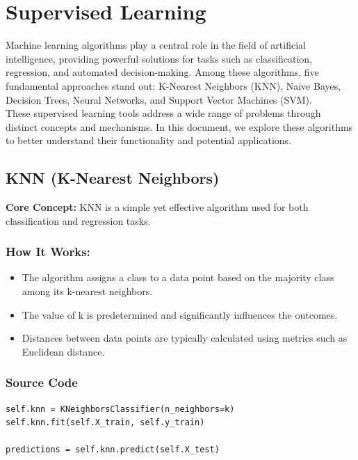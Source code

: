 \documentclass[a4paper,12pt]{article}
\begin{document}
\section{Supervised Learning}
Machine learning algorithms play a central role in the field of artificial intelligence, providing powerful solutions for tasks such as classification, regression, and automated decision-making. Among these algorithms, five fundamental approaches stand out: K-Nearest Neighbors (KNN), Naive Bayes, Decision Trees, Neural Networks, and Support Vector Machines (SVM).\\

These supervised learning tools address a wide range of problems through distinct concepts and mechanisms. In this document, we explore these algorithms to better understand their functionality and potential applications.

\subsection{KNN (K-Nearest Neighbors)}
\textbf{Core Concept:} KNN is a simple yet effective algorithm used for both classification and regression tasks.
\subsubsection*{How It Works:}
\begin{itemize}
    \item The algorithm assigns a class to a data point based on the majority class among its k-nearest neighbors.
    \item The value of k is predetermined and significantly influences the outcomes.
    \item Distances between data points are typically calculated using metrics such as Euclidean distance.
\end{itemize}

\subsubsection*{Source Code}
\begin{lstlisting}[style=python]
self.knn = KNeighborsClassifier(n_neighbors=k)
self.knn.fit(self.X_train, self.y_train)

predictions = self.knn.predict(self.X_test)
\end{lstlisting}
\end{document}

